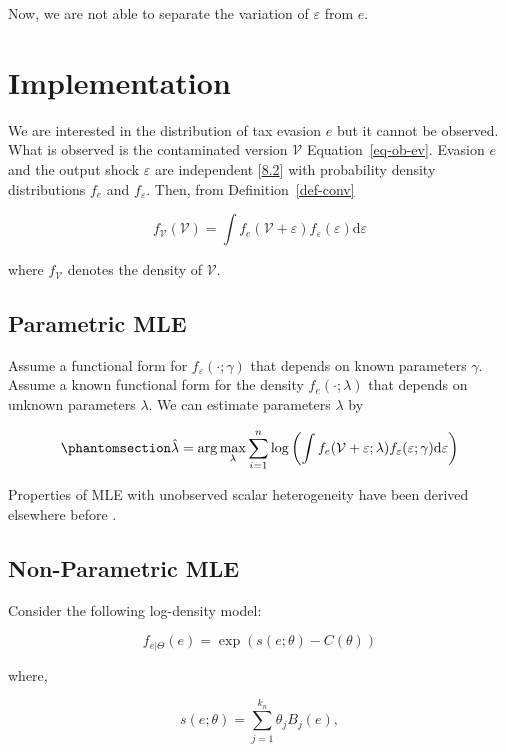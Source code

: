 \documentclass[
  12pt]{article}
\theoremstyle{definition}
\theoremstyle{remark}
\begin{document}
Now, we are not able to separate the variation of \(\varepsilon\) from
\(e\).

\section{Implementation}\label{implementation}

We are interested in the distribution of tax evasion \(e\) but it cannot
be observed. What is observed is the contaminated version
\(\mathcal{V}\) Equation~\ref{eq-ob-ev}. Evasion \(e\) and the output
shock \(\varepsilon\) are independent {[}\hyperref[ass-ind]{8.2}{]} with
probability density distributions \(f_e\) and \(f_{\varepsilon}\). Then,
from Definition~\ref{def-conv}

\[
f_{\mathcal{V}}(\mathcal{V})=\int f_e(\mathcal{V}+\varepsilon)f_{\varepsilon}(\varepsilon)\text{d}\varepsilon
\]

where \(f_{\mathcal{V}}\) denotes the density of \(\mathcal{V}\).

\subsection{Parametric MLE}\label{parametric-mle}

Assume a functional form for \(f_{\varepsilon}(\cdot;\gamma)\) that
depends on known parameters \(\gamma\). Assume a known functional form
for the density \(f_e(\cdot;\lambda)\) that depends on unknown
parameters \(\lambda\). We can estimate parameters \(\lambda\) by

\begin{equation}\phantomsection\label{eq-mle}{
\hat \lambda = \arg \max_{\lambda}\sum_{i=1}^n \log \left(\int f_e(\mathcal{V}+\varepsilon;\lambda)f_{\varepsilon}(\varepsilon;\gamma)\text{d}\varepsilon\right)
}\end{equation}

Properties of MLE with unobserved scalar heterogeneity have been derived
elsewhere before \citep{Chen2007, Yi2021}.

\subsection{Non-Parametric MLE}\label{non-parametric-mle}

Consider the following log-density model:

\[
f_{e|\Theta}(e)=\exp(s(e;\theta)-C(\theta))
\]

where,

\[
s(e;\theta)=\sum_{j=1}^{k_n}\theta_j B_j(e),
\]
\end{document}
